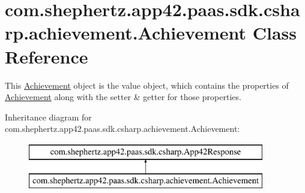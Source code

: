 \hypertarget{classcom_1_1shephertz_1_1app42_1_1paas_1_1sdk_1_1csharp_1_1achievement_1_1_achievement}{\section{com.\+shephertz.\+app42.\+paas.\+sdk.\+csharp.\+achievement.\+Achievement Class Reference}
\label{classcom_1_1shephertz_1_1app42_1_1paas_1_1sdk_1_1csharp_1_1achievement_1_1_achievement}
}


This \hyperlink{classcom_1_1shephertz_1_1app42_1_1paas_1_1sdk_1_1csharp_1_1achievement_1_1_achievement}{Achievement} object is the value object, which contains the properties of \hyperlink{classcom_1_1shephertz_1_1app42_1_1paas_1_1sdk_1_1csharp_1_1achievement_1_1_achievement}{Achievement} along with the setter \& getter for those properties.  


Inheritance diagram for com.\+shephertz.\+app42.\+paas.\+sdk.\+csharp.\+achievement.\+Achievement\+:\begin{figure}[H]
\begin{center}
\leavevmode
\includegraphics[height=2.000000cm]{classcom_1_1shephertz_1_1app42_1_1paas_1_1sdk_1_1csharp_1_1achievement_1_1_achievement}
\end{center}
\end{figure}
